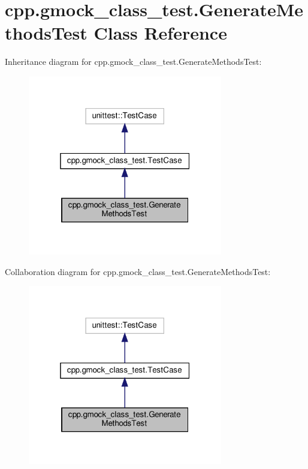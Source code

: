 \hypertarget{classcpp_1_1gmock__class__test_1_1_generate_methods_test}{}\section{cpp.\+gmock\+\_\+class\+\_\+test.\+Generate\+Methods\+Test Class Reference}
\label{classcpp_1_1gmock__class__test_1_1_generate_methods_test}


Inheritance diagram for cpp.\+gmock\+\_\+class\+\_\+test.\+Generate\+Methods\+Test\+:
\nopagebreak
\begin{figure}[H]
\begin{center}
\leavevmode
\includegraphics[width=241pt]{classcpp_1_1gmock__class__test_1_1_generate_methods_test__inherit__graph}
\end{center}
\end{figure}


Collaboration diagram for cpp.\+gmock\+\_\+class\+\_\+test.\+Generate\+Methods\+Test\+:
\nopagebreak
\begin{figure}[H]
\begin{center}
\leavevmode
\includegraphics[width=241pt]{classcpp_1_1gmock__class__test_1_1_generate_methods_test__coll__graph}
\end{center}
\end{figure}
